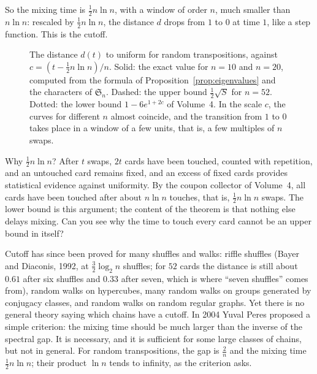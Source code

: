 So the mixing time is $\frac12n\ln n$, with a window of order $n$, much smaller than $n\ln n$: rescaled by $\frac12n\ln n$, the distance $d$ drops from $1$ to $0$ at time $1$, like a step function. This is the cutoff.

\begin{figure}[ht]
\centering
{}
\caption{The distance $d(t)$ to uniform for random transpositions, against $c=(t-\frac12n\ln n)/n$. Solid: the exact value for $n=10$ and $n=20$, computed from the formula of Proposition~\ref{prop:eigenvalues} and the characters of $\mathfrak S_n$. Dashed: the upper bound
$\frac12\sqrt S$ for $n=52$. Dotted: the lower bound $1-6e^{1+2c}$ of Volume~4. In the scale $c$, the curves for different $n$ almost coincide, and the transition from $1$ to $0$ takes place in a window of a few units, that is, a few multiples of $n$ swaps.}
\label{fig:cutoff}
\end{figure}

\begin{think}
Why $\frac12n\ln n$? After $t$ swaps, $2t$ cards have been touched, counted with repetition, and an untouched card remains fixed, and an excess of fixed cards provides statistical evidence against uniformity. By the coupon collector of Volume~4, all cards have been touched after about $n\ln n$ touches, that is, $\frac12n\ln n$ swaps.
The lower bound is this argument; the content of the theorem is that nothing else delays mixing. Can you see why the time to touch every card cannot be an upper bound in itself?
\end{think}

\begin{beauty}
Cutoff has since been proved for many shuffles and walks: riffle shuffles (Bayer and Diaconis, 1992, at $\frac32\log_2n$ shuffles; for $52$ cards the distance is still about $0.61$ after six shuffles and $0.33$ after seven, which is where ``seven shuffles'' comes from), random walks on hypercubes, many random walks on groups generated by conjugacy classes, and random walks on random
regular graphs. Yet there is no general theory saying which chains have a cutoff. In 2004 Yuval Peres proposed a simple criterion: the mixing time should be much larger than the inverse of the spectral gap. It is necessary, and it is sufficient for some large classes of
chains, but not in general. For random transpositions, the gap is $\frac2n$ and the mixing time $\frac12n\ln n$; their product $\ln n$ tends to infinity, as the criterion asks.
\end{beauty}


